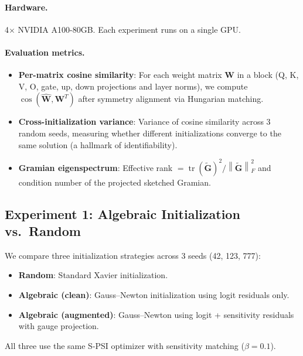 \documentclass{article}
\newcommand{\bW}{\mathbf{W}}
\newcommand{\bG}{\mathbf{G}}
\newcommand{\norm}[1]{\left\lVert #1 \right\rVert}
\DeclareMathOperator{\tr}{tr}
\begin{document}
\paragraph{Hardware.} 4$\times$ NVIDIA A100-80GB. Each experiment runs on a single GPU.

\paragraph{Evaluation metrics.}
\begin{itemize}
    \item \textbf{Per-matrix cosine similarity}: For each weight matrix $\bW$ in a block (Q, K, V, O, gate, up, down projections and layer norms), we compute $\cos(\hat{\bW}, \bW^T)$ after symmetry alignment via Hungarian matching.
    \item \textbf{Cross-initialization variance}: Variance of cosine similarity across 3 random seeds, measuring whether different initializations converge to the same solution (a hallmark of identifiability).
    \item \textbf{Gramian eigenspectrum}: Effective rank $= \tr(\tilde{\bG})^2 / \norm{\tilde{\bG}}_F^2$ and condition number of the projected sketched Gramian.
\end{itemize}

\subsection{Experiment 1: Algebraic Initialization vs.\ Random}
\label{sec:exp1}

We compare three initialization strategies across 3 seeds (42, 123, 777):
\begin{itemize}
    \item \textbf{Random}: Standard Xavier initialization.
    \item \textbf{Algebraic (clean)}: Gauss--Newton initialization using logit residuals only.
    \item \textbf{Algebraic (augmented)}: Gauss--Newton using logit + sensitivity residuals with gauge projection.
\end{itemize}

All three use the same S-PSI optimizer with sensitivity matching ($\beta = 0.1$).
\end{document}

